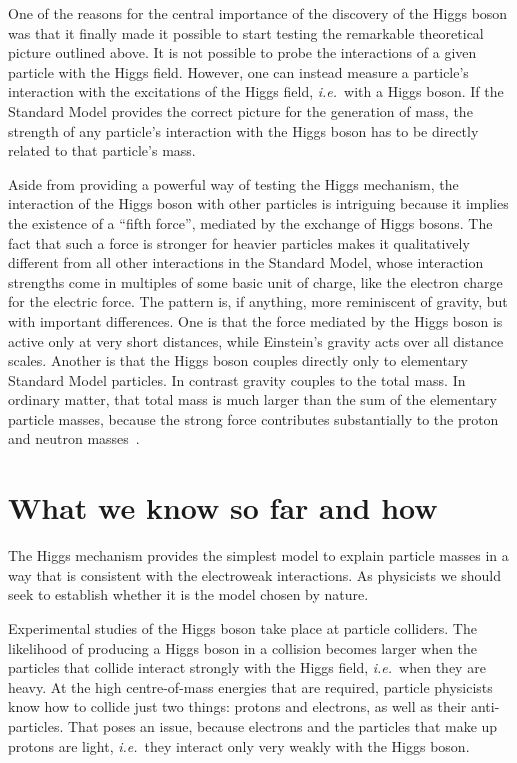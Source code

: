 \documentclass{article}
\begin{document}
   
One of the reasons for the central importance of the discovery of the
Higgs boson was that it finally made it possible to
start testing the remarkable theoretical picture outlined above.
%
It is not possible to probe the interactions of a given particle
with the Higgs field. However, one can instead measure a particle's
interaction with the excitations of the Higgs field, {\it i.e.}\ with a
Higgs boson.
%
If the Standard Model provides the correct picture for the generation
of mass, the strength of any particle's interaction with the Higgs
boson has to be directly related to that particle's mass.

Aside from providing a powerful way of testing the Higgs mechanism,
the interaction of the Higgs boson with other particles is intriguing
because it implies the existence of a ``fifth force'', mediated by the
exchange of Higgs bosons. 
%
The fact that such a force is stronger for heavier particles makes it
qualitatively different from all other interactions in the Standard
Model, whose interaction strengths come in multiples of some basic
unit of charge, like the electron charge for the electric force.
%
The pattern is, if anything, more reminiscent of gravity, but with
important differences.
%
One is that the force mediated by the Higgs boson is
% 
active only at very short distances,
while Einstein's gravity 
acts over all distance scales.
%
Another is that the Higgs boson couples directly only to elementary
Standard Model particles.
%
In contrast gravity couples to the total mass.
%
In ordinary matter, that total mass is much larger than the sum of the
elementary particle masses, because the strong force contributes substantially to the proton and neutron masses~\cite{Durr:2008zz}.



\section*{What we know so far and how}

The Higgs mechanism provides the simplest model to explain particle
masses in a way that is consistent with the electroweak interactions.
%
As physicists we should seek to establish whether it is the model
chosen by nature.

Experimental studies of the Higgs boson take place at particle
colliders.
%
The likelihood of producing a Higgs boson in a collision becomes larger
when the particles that collide interact strongly with the Higgs
field, {\it i.e.}\ when they are heavy.
%
At the high centre-of-mass energies that are required, particle
physicists know how to collide just two things: protons and electrons,
as well as their anti-particles.
%
That poses an issue, because electrons and the particles that make up
protons are light, {\it i.e.}\ they interact only very weakly with the Higgs
boson.
\end{document}
